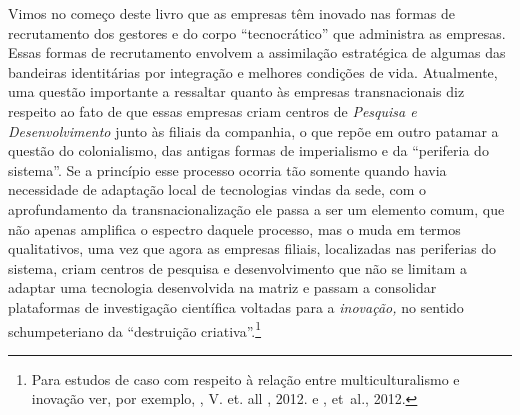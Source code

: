 Vimos no começo deste livro que as empresas têm inovado nas formas de
recrutamento dos gestores e do corpo ``tecnocrático'' que administra as
empresas. Essas formas de recrutamento envolvem a assimilação
estratégica de algumas das bandeiras identitárias por integração e
melhores condições de vida. Atualmente, uma questão importante a
ressaltar quanto às empresas transnacionais diz respeito ao fato de que
essas empresas criam centros de \emph{Pesquisa e Desenvolvimento} junto
às filiais da companhia, o que repõe em outro patamar a questão do
colonialismo, das antigas formas de imperialismo e da ``periferia do
sistema''. Se a princípio esse processo ocorria tão somente quando havia
necessidade de adaptação local de tecnologias vindas da sede, com o
aprofundamento da transnacionalização ele passa a ser um elemento comum,
que não apenas amplifica o espectro daquele processo, mas o muda em
termos qualitativos, uma vez que agora as empresas filiais, localizadas
nas periferias do sistema, criam centros de pesquisa e desenvolvimento
que não se limitam a adaptar uma tecnologia desenvolvida na matriz e
passam a consolidar plataformas de investigação científica voltadas para
a \emph{inovação,} no sentido schumpeteriano da ``destruição
criativa''.\footnote{Para estudos de caso com respeito à relação entre
  multiculturalismo e inovação ver, por exemplo, , V. et. all ,
  2012. e , et~al., 2012.}

